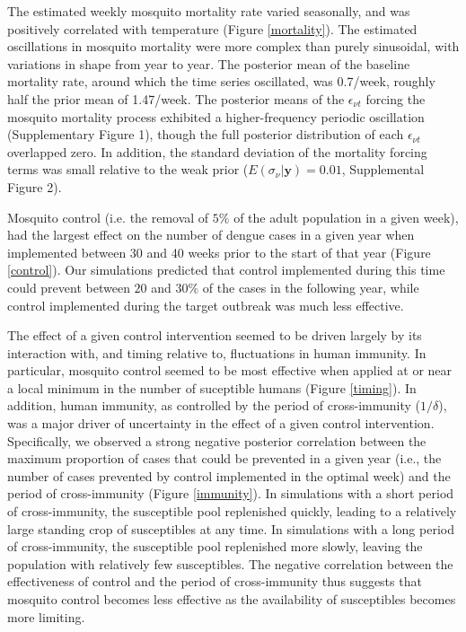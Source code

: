 \documentclass[10pt,letterpaper]{article}
\begin{document}
The estimated weekly mosquito mortality rate varied seasonally, and was positively correlated with temperature (Figure \ref{mortality}).
The estimated oscillations in mosquito mortality were more complex than purely sinusoidal, with variations in shape from year to year.
The posterior mean of the baseline mortality rate, around which the time series oscillated, was 0.7/week, roughly half the prior mean of 1.47/week.
The posterior means of the $\epsilon_{\nu t}$ forcing the mosquito mortality process exhibited a higher-frequency periodic oscillation (Supplementary Figure 1), though the full posterior distribution of each $\epsilon_{\nu t}$ overlapped zero.
In addition, the standard deviation of the mortality forcing terms was small relative to the weak prior ($E(\sigma_{\nu}|\mathbf{y}) = 0.01$, Supplemental Figure 2).

Mosquito control (i.e. the removal of $5\%$ of the adult population in a given week), had the largest effect on the number of dengue cases in a given year when implemented between 30 and 40 weeks prior to the start of that year (Figure \ref{control}).
Our simulations predicted that control implemented during this time could prevent between $20$ and $30\%$ of the cases in the following year, while control implemented during the target outbreak was much less effective.

The effect of a given control intervention seemed to be driven largely by its interaction with, and timing relative to, fluctuations in human immunity.
In particular, mosquito control seemed to be most effective when applied at or near a local minimum in the number of suceptible humans (Figure \ref{timing}).
In addition, human immunity, as controlled by the period of cross-immunity ($1/\delta$), was a major driver of uncertainty in the effect of a given control intervention.
Specifically, we observed a strong negative posterior correlation between the maximum proportion of cases that could be prevented in a given year (i.e., the number of cases prevented by control implemented in the optimal week) and the period of cross-immunity (Figure \ref{immunity}). 
In simulations with a short period of cross-immunity, the susceptible pool replenished quickly, leading to a relatively large standing crop of susceptibles at any time.
In simulations with a long period of cross-immunity, the susceptible pool replenished more slowly, leaving the population with relatively few susceptibles.
The negative correlation between the effectiveness of control and the period of cross-immunity thus suggests that mosquito control becomes less effective as the availability of susceptibles  becomes more limiting.
\end{document}
